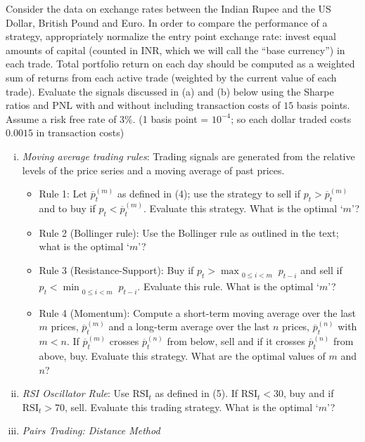  Consider the data on exchange rates between the Indian Rupee and the US Dollar, British Pound and Euro. In order to compare the performance of a strategy, appropriately normalize the entry point exchange rate: invest equal amounts of capital (counted in INR, which we will call the ``base currency'') in each trade. Total portfolio return on each day should be computed as a weighted sum of returns from each active trade (weighted by the current value of each trade). Evaluate the signals discussed in (a) and (b) below using the Sharpe ratios and PNL with and without including transaction costs of $15$ basis points. Assume a risk free rate of $3\%$. (1 basis point = $10^{-4}$; so each dollar traded costs $0.0015$ in transaction costs)
	\begin{enumerate}[(i)]
	\item{\it Moving average trading rules}: Trading signals are generated from the relative levels of the price series and a moving average of past prices.
		\begin{itemize}
		\item  Rule 1: Let $\overline{p}_t^{(m)}$ as defined in (4); use the strategy to sell if $p_t>\overline{p}_t^{(m)}$ and to buy if  $p_t<\overline{p}_t^{(m)}$. Evaluate this strategy. What is the optimal `$m$'?
		\item Rule 2 (Bollinger rule): Use the Bollinger rule as outlined in the text; what is the optimal `$m$'?
		\item Rule 3 (Resistance-Support): Buy if $p_t > \max_{\substack{0\le i< m}}p_{t-i}$ and sell if $p_t < \min_{\substack{0\le i< m}}p_{t-i}$. Evaluate this rule. What is the optimal `$m$'?
		\item Rule 4 (Momentum): Compute a short-term moving average over the last $m$ prices, $\overline{p}_t^{(m)}$ and a long-term average over the last $n$ prices, $\overline{p}_t^{(n)}$ with $m<n$. If $\overline{p}_t^{(m)}$ crosses $\overline{p}_t^{(n)}$ from below, sell and if it crosses $\overline{p}_t^{(n)}$ from above, buy. Evaluate this strategy. What are the optimal values of $m$ and $n$?
		\end{itemize}
	\item{\it RSI Oscillator Rule}: Use $\text{RSI}_t$ as defined in (5). \hfill \break
If $\text{RSI}_t<30$, buy and if $\text{RSI}_t>70$, sell. Evaluate this trading strategy. What is the optimal `$m$'?

	\item {\it Pairs Trading: Distance Method}


\end{enumerate}
